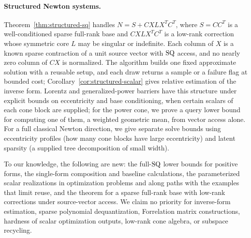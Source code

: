 \paragraph{Structured Newton systems.}
Theorem~\ref{thm:structured-sq} handles
$N=S+CXLX^TC^T$, where $S=CC^T$ is a well-conditioned sparse full-rank
base and $CXLX^TC^T$ is a low-rank correction whose symmetric core $L$
may be singular or indefinite.
Each column of $X$ is a known sparse contraction of a unit source vector
with $\mathrm{SQ}$ access, and no nearly zero column of $CX$ is normalized. The
algorithm builds one fixed approximate solution with a reusable setup,
and each draw returns a sample or a failure flag at bounded cost;
Corollary~\ref{cor:structured-scalar} gives relative estimation of the
inverse form. Lorentz and generalized-power barriers have this structure
under explicit bounds on eccentricity and base conditioning, when certain
scalars of each cone block are supplied; for the power cone, we prove a
query lower bound for computing one of them, a weighted geometric mean,
from vector access alone. For a full classical Newton direction, we give
separate solve bounds using eccentricity profiles (how many cone blocks
have large eccentricity) and latent sparsity (a supplied tree
decomposition of small width).

To our knowledge, the following are new: the full-$\mathrm{SQ}$ lower bounds for
positive forms, the single-form composition and baseline calculations,
the parameterized scalar realizations in optimization problems and along
paths with the examples that limit reuse, and the theorem for a sparse
full-rank base with low-rank corrections under source-vector access. We
claim no priority for inverse-form estimation, sparse polynomial
dequantization, Forrelation matrix constructions, hardness of scalar
optimization outputs, low-rank cone algebra, or subspace recycling.

